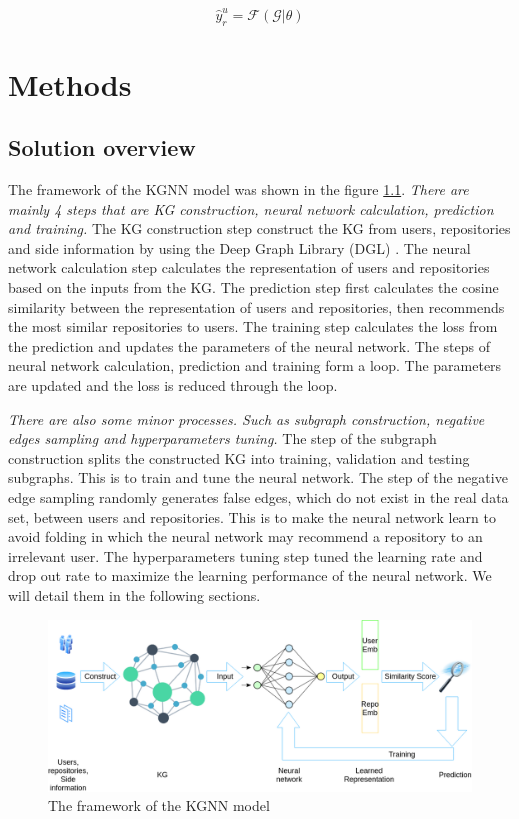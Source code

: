 \documentclass[11pt,twoside]{report}
\begin{document}
\begin{equation}
    \hat{y}_r^u=\mathcal{F}(\mathcal{G}|\theta)
    \label{eq:problem_framing}
\end{equation}

\chapter{Methods}
\section{Solution overview}
The framework of the KGNN model was shown in the figure \ref{fig:kgnn_framework}. \textit{There are mainly 4 steps that are KG construction, neural network calculation, prediction and training.} The KG construction step construct the KG from users, repositories and side information by using the Deep Graph Library (DGL) \cite{wang2019dgl}. The neural network calculation step calculates the representation of users and repositories based on the inputs from the KG. The prediction step first calculates the cosine similarity between the representation of users and repositories, then recommends the most similar repositories to users. The training step calculates the loss from the prediction and updates the parameters of the neural network. The steps of neural network calculation, prediction and training form a loop. The parameters are updated and the loss is reduced through the loop.

\textit{There are also some minor processes. Such as subgraph construction, negative edges sampling and hyperparameters tuning.} The step of the subgraph construction splits the constructed KG into training, validation and testing subgraphs. This is to train and tune the neural network. The step of the negative edge sampling randomly generates false edges, which do not exist in the real data set, between users and repositories. This is to make the neural network learn to avoid folding \cite{xin_folding_2017} in which the neural network may recommend a repository to an irrelevant user. The hyperparameters tuning step tuned the learning rate and drop out rate to maximize the learning performance of the neural network. We will detail them in the following sections.
 
\begin{figure}[H]
    \centering
    \includegraphics[scale=0.4]{KGCN Overview.png}
    \caption{The framework of the KGNN model}
    \label{fig:kgnn_framework}
\end{figure}
\end{document}
